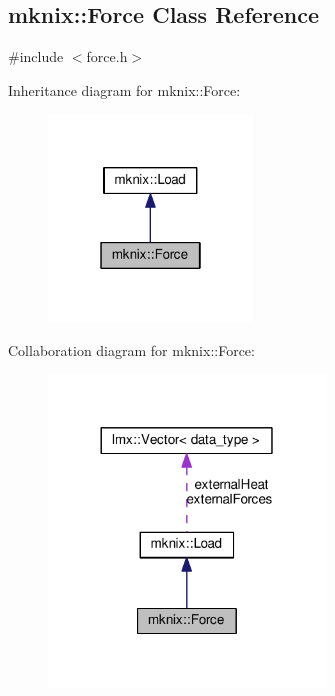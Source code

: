 \hypertarget{classmknix_1_1_force}{}\subsection{mknix\+:\+:Force Class Reference}
\label{classmknix_1_1_force}


{\ttfamily \#include $<$force.\+h$>$}



Inheritance diagram for mknix\+:\+:Force\+:\nopagebreak
\begin{figure}[H]
\begin{center}
\leavevmode
\includegraphics[width=154pt]{d4/df8/classmknix_1_1_force__inherit__graph}
\end{center}
\end{figure}


Collaboration diagram for mknix\+:\+:Force\+:\nopagebreak
\begin{figure}[H]
\begin{center}
\leavevmode
\includegraphics[width=209pt]{d6/de1/classmknix_1_1_force__coll__graph}
\end{center}
\end{figure}
